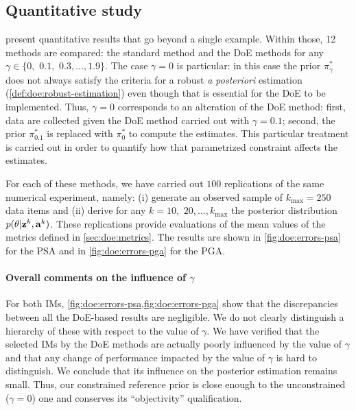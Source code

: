     \subsection{Quantitative study}\label{sec:doe:appli:subsec:quantitative}



 present 
quantitative results that go beyond a single example.
Within those, 12 methods are compared:
    the standard method and the DoE methods for any $\gamma\in\{0,$ $0.1,$ $0.3,\dots,1.9\}$.
The case $\gamma=0$ is particular: in this case the prior $\pi^\ast_\gamma$ does not always satisfy the criteria for a robust \emph{a posteriori} estimation (\cref{def:doe:robust-estimation}) even though that is essential for the DoE to be implemented. Thus, $\gamma=0$ corresponds to an alteration of the DoE method:
    first, data are collected given the DoE method carried out with $\gamma=0.1$; second, the prior $\pi^\ast_{0.1}$ is replaced with $\pi^\ast_0$ to compute the estimates.
This particular treatment is carried out in order to quantify how that parametrized constraint affects the estimates.

{For each of these methods, we have carried out $100$ replications of the same numerical experiment, namely: (i) generate an observed sample of $k_{\max}=250$ data items and (ii) derive for any $k=10,$ $20,\dots,k_{\max}$ the posterior distribution $p(\theta|\mathbf{z}^k,\mathbf{a}^k)$.
These replications provide evaluations of the mean values of the metrics defined in \cref{sec:doe:metrics}. The results are shown in  \cref{fig:doe:errors-psa} for the PSA and in  \cref{fig:doe:errors-pga} for the PGA.}


\paragraph{{Overall comments on the influence of $\gamma$}}

{For both IMs, \cref{fig:doe:errors-psa,fig:doe:errors-pga} show that the discrepancies between all the DoE-based results are negligible. We do not clearly distinguish a hierarchy of these with respect to the value of $\gamma$.}
We have verified that the selected IMs by the DoE methods are actually poorly influenced by the value of $\gamma$ and that any change of performance impacted by the value of $\gamma$ is hard to distinguish. We conclude that its influence on the posterior estimation remains small. Thus, our constrained reference prior is close enough to the unconstrained ($\gamma = 0$) one and conserves its ``objectivity'' qualification.

